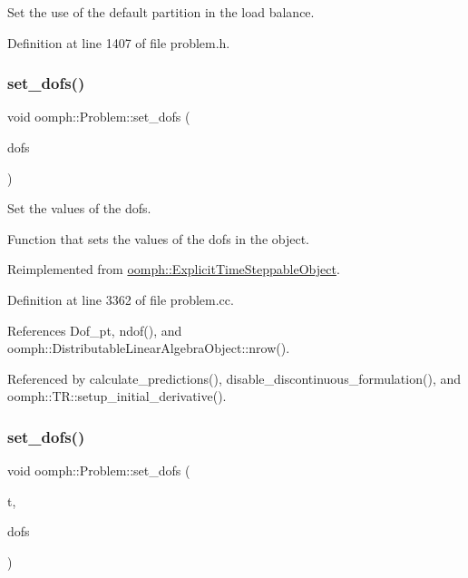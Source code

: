 Set the use of the default partition in the load balance. 



Definition at line 1407 of file problem.\+h.

\mbox{\label{classoomph_1_1Problem_ab51480d18550c107c9f13629102f6b08}} 
\subsubsection{\texorpdfstring{set\+\_\+dofs()}{set\_dofs()}\hspace{0.1cm}{\footnotesize\ttfamily [1/3]}}
{\footnotesize\ttfamily void oomph\+::\+Problem\+::set\+\_\+dofs (\begin{DoxyParamCaption}\item[{const \hyperlink{classoomph_1_1DoubleVector}{Double\+Vector} \&}]{dofs }\end{DoxyParamCaption})\hspace{0.3cm}{\ttfamily [virtual]}}



Set the values of the dofs. 

Function that sets the values of the dofs in the object. 

Reimplemented from \hyperlink{classoomph_1_1ExplicitTimeSteppableObject_a76a8d64f2d6aa8de955b44c86e9b3ecb}{oomph\+::\+Explicit\+Time\+Steppable\+Object}.



Definition at line 3362 of file problem.\+cc.



References Dof\+\_\+pt, ndof(), and oomph\+::\+Distributable\+Linear\+Algebra\+Object\+::nrow().



Referenced by calculate\+\_\+predictions(), disable\+\_\+discontinuous\+\_\+formulation(), and oomph\+::\+T\+R\+::setup\+\_\+initial\+\_\+derivative().

\mbox{\label{classoomph_1_1Problem_a62d7dbbf49388e6383e3b93e50351e89}} 
\subsubsection{\texorpdfstring{set\+\_\+dofs()}{set\_dofs()}\hspace{0.1cm}{\footnotesize\ttfamily [2/3]}}
{\footnotesize\ttfamily void oomph\+::\+Problem\+::set\+\_\+dofs (\begin{DoxyParamCaption}\item[{const unsigned \&}]{t,  }\item[{\hyperlink{classoomph_1_1DoubleVector}{Double\+Vector} \&}]{dofs }\end{DoxyParamCaption})}



